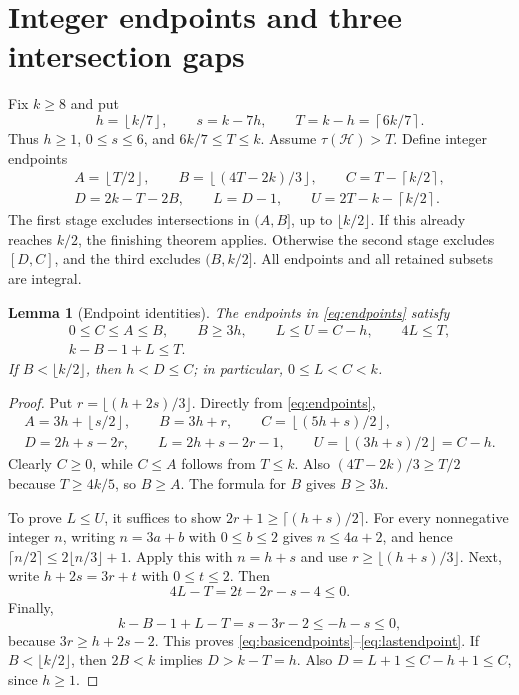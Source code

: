 \documentclass[11pt]{article}
\numberwithin{equation}{section}
\newtheorem{lemma}[theorem]{Lemma}
\theoremstyle{definition}
\theoremstyle{remark}
\newcommand{\HH}{\mathcal H}
\newcommand{\ceil}[1]{\left\lceil #1\right\rceil}
\newcommand{\floor}[1]{\left\lfloor #1\right\rfloor}
\begin{document}
\section{Integer endpoints and three intersection gaps}\label{sec:gaps}
Fix $k\ge8$ and put
\begin{equation}\label{eq:budget}
 h=\floor{k/7},\qquad s=k-7h,\qquad T=k-h=\ceil{6k/7}.
\end{equation}
Thus $h\ge1$, $0\le s\le6$, and $6k/7\le T\le k$.
Assume $\tau(\HH)>T$. Define integer endpoints
\begin{equation}\label{eq:endpoints}
 \begin{gathered}
 A=\floor{T/2},\qquad B=\floor{(4T-2k)/3},\qquad
 C=T-\ceil{k/2},\\
 D=2k-T-2B,\qquad L=D-1,\qquad U=2T-k-\ceil{k/2}.
 \end{gathered}
\end{equation}
The first stage excludes intersections in $(A,B]$, up to $\lfloor k/2\rfloor$.
If this already reaches $k/2$, the finishing theorem applies. Otherwise
the second stage excludes $[D,C]$, and the third excludes $(B,k/2]$.
All endpoints and all retained subsets are integral.

\begin{lemma}[Endpoint identities]\label{lem:endpoints}
The endpoints in \eqref{eq:endpoints} satisfy
\begin{gather}
 0\le C\le A\le B,\qquad B\ge3h,\qquad
 L\le U=C-h,\qquad4L\le T,\label{eq:basicendpoints}\\
 k-B-1+L\le T.\label{eq:lastendpoint}
\end{gather}
If $B<\lfloor k/2\rfloor$, then $h<D\le C$; in particular,
$0\le L<C<k$.
\end{lemma}
\begin{proof}
Put $r=\lfloor(h+2s)/3\rfloor$. Directly from \eqref{eq:endpoints},
\begin{gather*}
 A=3h+\floor{s/2},\qquad B=3h+r,\qquad
 C=\floor{(5h+s)/2},\\
 D=2h+s-2r,\qquad L=2h+s-2r-1,\qquad
 U=\floor{(3h+s)/2}=C-h.
\end{gather*}
Clearly $C\ge0$, while $C\le A$ follows from $T\le k$.
Also $(4T-2k)/3\ge T/2$ because $T\ge4k/5$, so $B\ge A$.
The formula for $B$ gives $B\ge3h$.

To prove $L\le U$, it suffices to show
$2r+1\ge\lceil(h+s)/2\rceil$.
For every nonnegative integer $n$, writing $n=3a+b$ with $0\le b\le2$
gives $n\le4a+2$, and hence
$\lceil n/2\rceil\le2\lfloor n/3\rfloor+1$.
Apply this with $n=h+s$ and use $r\ge\lfloor(h+s)/3\rfloor$.
Next, write $h+2s=3r+t$ with $0\le t\le2$. Then
\[
 4L-T=2t-2r-s-4\le0.
\]
Finally,
\[
 k-B-1+L-T=s-3r-2\le-h-s\le0,
\]
because $3r\ge h+2s-2$. This proves
\eqref{eq:basicendpoints}--\eqref{eq:lastendpoint}.
If $B<\lfloor k/2\rfloor$, then $2B<k$ implies $D>k-T=h$.
Also $D=L+1\le C-h+1\le C$, since $h\ge1$.
\end{proof}
\end{document}
